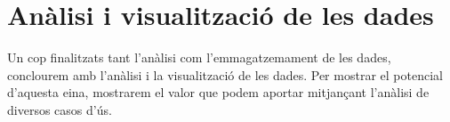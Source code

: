 \chapter{Anàlisi i visualització de les dades}\label{ch:log-analysis}

Un cop finalitzats tant l'anàlisi com l'emmagatzemament de les dades, conclourem amb l'anàlisi i la visualització de les dades.
Per mostrar el potencial d'aquesta eina, mostrarem el valor que podem aportar mitjançant l'anàlisi de diversos casos d’ús.

\noindent \\

\clearpage
